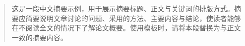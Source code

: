 \begin{abstract}

这是一段中文摘要示例，用于展示摘要标题、正文与关键词的排版方式。摘要应简要说明文章讨论的问题、采用的方法、主要内容与结论，使读者能够在不阅读全文的情况下了解论文概要。使用模板时，请将本段替换为与正文一致的摘要内容。


\end{abstract}
